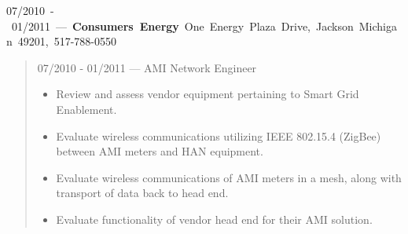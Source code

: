 \mbox{07/2010 - 01/2011 --- {\bf Consumers Energy} One Energy Plaza Drive, Jackson Michigan 49201, 517-788-0550}
\begin{quote}
07/2010 - 01/2011 --- AMI Network Engineer\\
\begin{itemize}
\item Review and assess vendor equipment pertaining to Smart Grid Enablement.
\item Evaluate wireless communications utilizing IEEE 802.15.4 (ZigBee)
between AMI meters and HAN equipment.
\item Evaluate wireless communications of AMI meters in a mesh, along with
transport of data back to head end.
\item Evaluate functionality of vendor head end for their AMI solution.
\end{itemize}
\end{quote}
